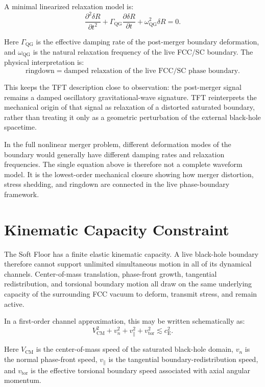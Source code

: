 A minimal linearized relaxation model is:
\begin{equation}
    \frac{\partial^2 \delta R}{\partial t^2} + \Gamma_{\mathrm{QG}}\frac{\partial \delta R}{\partial t} + \omega_{\mathrm{QG}}^2\delta R = 0.
\end{equation}

Here $\Gamma_{\mathrm{QG}}$ is the effective damping rate of the post-merger boundary deformation, and $\omega_{\mathrm{QG}}$ is the natural relaxation frequency of the live FCC/SC boundary.
The physical interpretation is:
\begin{equation}
    \text{ringdown} = \text{damped relaxation of the live FCC/SC phase boundary}.
\end{equation}

This keeps the TFT description close to observation: the post-merger signal remains a damped oscillatory gravitational-wave signature. TFT reinterprets the mechanical origin of that signal as relaxation of a distorted saturated boundary, rather than treating it only as a geometric perturbation of the external black-hole spacetime.

In the full nonlinear merger problem, different deformation modes of the boundary would generally have different damping rates and relaxation frequencies. The single equation above is therefore not a complete waveform model. It is the lowest-order mechanical closure showing how merger distortion, stress shedding, and ringdown are connected in the live phase-boundary framework.

\section{Kinematic Capacity Constraint}

The Soft Floor has a finite elastic kinematic capacity. A live black-hole boundary therefore cannot support unlimited simultaneous motion in all of its dynamical channels. Center-of-mass translation, phase-front growth, tangential redistribution, and torsional boundary motion all draw on the same underlying capacity of the surrounding FCC vacuum to deform, transmit stress, and remain active.

In a first-order channel approximation, this may be written schematically as:
\begin{equation}
    V_{\mathrm{CM}}^2 + v_n^2 + v_{\parallel}^2 + v_{\mathrm{tor}}^2 \lesssim c_{\mathrm{E}}^2.
\end{equation}

Here $V_{\mathrm{CM}}$ is the center-of-mass speed of the saturated black-hole domain, $v_n$ is the normal phase-front speed, $v_{\parallel}$ is the tangential boundary-redistribution speed, and $v_{\mathrm{tor}}$ is the effective torsional boundary speed associated with axial angular momentum.

